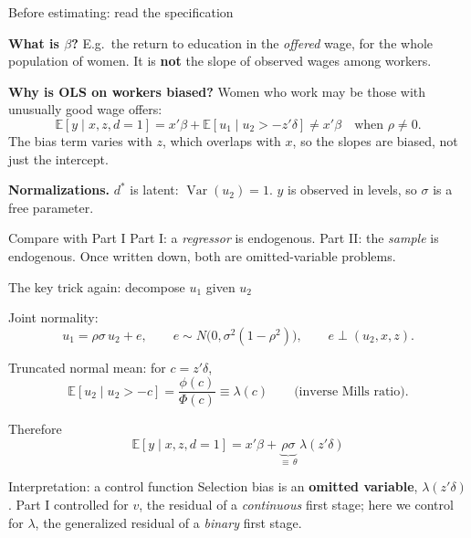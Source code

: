 \documentclass[aspectratio=169,11pt]{beamer}
\newcommand{\E}{\mathbb{E}}
\newcommand{\Mills}{\lambda}
\begin{document}
\begin{frame}{Before estimating: read the specification}

\textbf{What is $\beta$?} E.g.\ the return to education in the
\emph{offered} wage, for the whole population of women.
It is \textbf{not} the slope of observed wages among workers.

\pause

\vspace{0.3em}

\textbf{Why is OLS on workers biased?} Women who work may be those with
unusually good wage offers:
\[
\E[y\mid x,z,d=1]=x'\beta+\E[u_1\mid u_2>-z'\delta]\neq x'\beta
\quad\text{when }\rho\neq 0 .
\]
The bias term varies with $z$, which overlaps with $x$, so the slopes are
biased, not just the intercept.

\pause

\textbf{Normalizations.} $d^*$ is latent: $\operatorname{Var}(u_2)=1$.
$y$ is observed in levels, so $\sigma$ is a free parameter.

\vspace{0.3em}

\begin{alertblock}{Compare with Part I}
Part I: a \emph{regressor} is endogenous.
Part II: the \emph{sample} is endogenous.
Once written down, both are omitted-variable problems.
\end{alertblock}

\end{frame}

\begin{frame}{The key trick again: decompose $u_1$ given $u_2$}

Joint normality:
\[
u_1=\rho\sigma\,u_2 + e,\qquad e\sim N\big(0,\sigma^2(1-\rho^2)\big),
\qquad e\perp (u_2,x,z).
\]

\pause

Truncated normal mean: for $c=z'\delta$,
\[
\E[u_2\mid u_2>-c]=\frac{\phi(c)}{\Phi(c)}\equiv\Mills(c)
\qquad\text{(inverse Mills ratio)}.
\]

\pause

Therefore
\[
\boxed{
\E[y\mid x,z,d=1]
= x'\beta + \underbrace{\rho\sigma}_{\equiv\,\theta}\,\Mills(z'\delta)
}
\]

\pause

\begin{block}{Interpretation: a control function}
Selection bias is an \textbf{omitted variable}, $\Mills(z'\delta)$.
Part I controlled for $v$, the residual of a \emph{continuous} first stage;
here we control for $\Mills$, the generalized residual of a
\emph{binary} first stage.
\end{block}

\end{frame}
\end{document}
